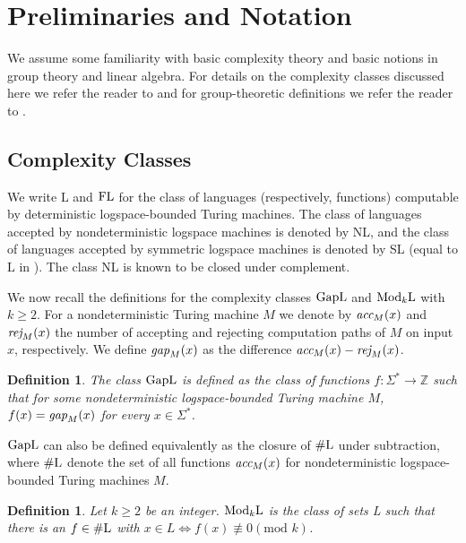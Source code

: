 \documentclass[11pt]{article}
\newtheorem{definition}[theorem]{Definition}
\newcommand{\gap}{\mbox{\it gap}}
\newcommand{\Lo}{\ensuremath{\mathrm{L}}}
\newcommand{\GapL}{\mbox{\rm GapL}}
\newcommand{\ModkL}{\mbox{\rm Mod$_k$L}}
\newcommand{\FL}{\mbox{\rm FL}}
\newcommand{\sharpL}{\mbox{$\#$\rm L}}
\newcommand{\Z}{\mathbb{Z}}
\newcommand{\acc}{\mbox{\it acc}}
\newcommand{\rej}{\mbox{\it rej}}
\begin{document}
\section{Preliminaries and Notation}\label{defs}

We assume some familiarity with basic complexity theory and basic
notions in group theory and linear algebra. For details on the
complexity classes discussed here we refer the reader to
\cite{allender99complexity} and for group-theoretic definitions we
refer the reader to \cite{hallbook,wielandt64finite}.

\subsection{Complexity Classes}

We write $\Lo$ and $\FL$ for the class of languages (respectively,
functions) computable by deterministic logspace-bounded Turing
machines. The class of languages accepted by nondeterministic logspace
machines is denoted by NL, and the class of languages accepted by
symmetric logspace machines is denoted by SL (equal to $\Lo$ in
\cite{rein}). The class NL is known to be closed under complement.

We now recall the definitions for the complexity classes $\GapL$ and
$\ModkL$ with $k\geq2$. For a nondeterministic Turing machine $M$ we
denote by $\acc_M(x)$ and $\rej_M(x)$ the number of accepting and
rejecting computation paths of $M$ on input $x$, respectively. We
define $\gap_M(x)$ as the difference $\acc_M(x)-\rej_M(x)$.

\begin{definition}\label{GapL}
 The class $\GapL$ is defined as the class of functions
  $f:\Sigma^*\longrightarrow \Z$ such that for some nondeterministic
  logspace-bounded Turing machine $M$, $f(x)=\gap_M(x)$ for every
  $x\in\Sigma^*$.
\end{definition}

$\GapL$ can also be defined equivalently as the closure of $\sharpL$
under subtraction, where $\sharpL$ denote the set of all functions
$\acc_M(x)$ for nondeterministic logspace-bounded Turing machines $M$.

\begin{definition}\label{ModkL}
  Let $k\geq 2$ be an integer. $\ModkL$ is the class of sets L such
  that there is an $f\in\sharpL$ with $x\in L\Leftrightarrow
  f(x)\not\equiv 0(\mbox{mod }k)$.
\end{definition}
\end{document}
